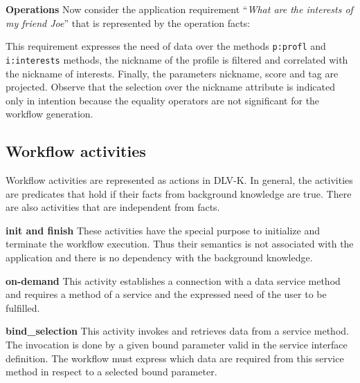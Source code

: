 \textbf{Operations} Now consider the application requirement ``\textit{What are the interests of my friend Joe}'' that is represented by the operation facts:

%



This requirement expresses the need of data over the methods \texttt{p:profl} and \texttt{i:interests} methods, the nickname of the profile is filtered and correlated with the nickname of interests. Finally, the parameters nickname, score and tag are projected. Observe that the selection over the nickname attribute is indicated only in intention because the equality operators are not significant for the workflow generation.

\subsection{Workflow activities}
Workflow activities are represented as actions in DLV-K. In general, the activities are predicates that hold if their facts from background knowledge are true. There are also activities that are independent from facts.
         
\textbf{init and finish} These activities have the special purpose to initialize and terminate the workflow execution. Thus their semantics is not associated with the application and there is no dependency with the background knowledge.

\textbf{on-demand} This activity establishes a connection with a data service method and requires a method of a service and the expressed need of the user to be fulfilled.

%



\textbf{bind_selection}
This activity invokes and retrieves data from a service method. The invocation is done by a given bound parameter valid in the service interface definition. The workflow must express which data are required from this service method in respect to a selected bound parameter.

%

